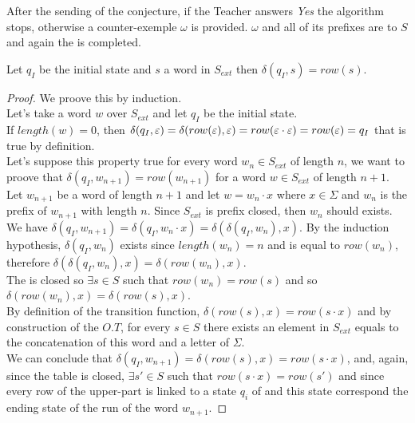 After the sending of the conjecture, if the Teacher answers \textit{Yes} the algorithm stops, otherwise a counter-exemple $\omega$ is provided. $\omega$ and all of its prefixes are to $S$ and again the \OT is completed.

\begin{lemma}
  \label{lemma:L_trans_from_QI}
  Let $q_I$ be the initial state and $s $ a word in $S_{ext}$ then $\delta(q_I, s) = row(s)$.
\end{lemma}

\begin{proof}
  We proove this by induction.\\
  Let's take a word $w$ over $S_{ext}$ and let $q_I$ be the initial state. \\
  If $length(w) = 0$, then $\delta(q_I, \varepsilon) = \delta(row(\varepsilon), \varepsilon) =  row(\varepsilon \cdot \varepsilon) = row(\varepsilon) = q_I$ that is true by definition.\\
  Let's suppose this property true for every word $w_n \in S_{ext}$ of length $n$, we want to proove that $\delta(q_I, w_{n+1}) = row(w_{n+1})$ for a word $w \in S_{ext}$ of length $n+1$.\\
  Let $w_{n+1}$ be a word of length $n+1$ and let $w = w_n \cdot x$ where $x \in \Sigma$ and $w_n$ is the prefix of $w_{n+1}$ with length $n$. Since $S_{ext}$ is prefix closed, then $w_n$ should exists.\\
  We have $\delta(q_I, w_{n+1}) = \delta(q_I, w_n \cdot x) = \delta(\delta(q_I, w_n), x)$. By the induction hypothesis, $\delta(q_I, w_n)$ exists since $length(w_n) = n$ and is equal to $row(w_n)$, therefore $\delta(\delta(q_I, w_n), x) = \delta(row(w_n), x)$. \\
  The \OT is closed so $\exists s \in S$ such that $row(w_n) = row(s)$ and so $\delta(row(w_n), x) = \delta(row(s), x)$.\\
  By definition of the transition function, $\delta(row(s), x) = row(s \cdot x)$ and by construction of the $O.T$, for every $s \in S$ there exists an element in $S_{ext}$ equals to the concatenation of this word and a letter of $\Sigma$.\\
  We can conclude that $\delta(q_I, w_{n+1}) = \delta(row(s), x) = row(s \cdot x)$, and, again, since the table is closed, $\exists s' \in S$ such that $row(s \cdot x) = row(s')$ and since every row of the upper-part is linked to a state $q_i$ of \automaton{} and this state correspond the ending state of the run of the word $w_{n+1}$.
\end{proof}

